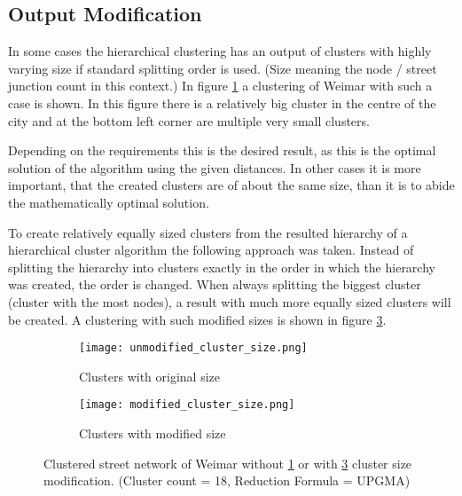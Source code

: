 \subsection{Output Modification} \label{sec:outout_modification}
In some cases the hierarchical clustering has an output of clusters with highly varying size if standard splitting order is used. (Size meaning the node / street junction count in this context.) In figure \ref{fig:unmodified_cluster_size} a clustering of Weimar with such a case is shown. In this figure there is a relatively big cluster in the centre of the city and at the bottom left corner are multiple very small clusters.

Depending on the requirements this is the desired result, as this is the optimal solution of the algorithm using the given distances. In other cases it is more important, that the created clusters are of about the same size, than it is to abide the mathematically optimal solution.

To create relatively equally sized clusters from the resulted hierarchy of a hierarchical cluster algorithm the following approach was taken. Instead of splitting the hierarchy into clusters exactly in the order in which the hierarchy was created, the order is changed. When always splitting the biggest cluster (cluster with the most nodes), a result with much more equally sized clusters will be created. A clustering with such modified sizes is shown in figure \ref{fig:modified_cluster_size}.

\begin{figure}
    \centering
    \begin{subfigure}[b]{0.49\textwidth}
        \begin{mdframed}[style=mdthight, userdefinedwidth=0.9\linewidth]
            \texttt{[image: unmodified\_cluster\_size.png]}
        \end{mdframed}
        \caption{Clusters with original size}
        \label{fig:unmodified_cluster_size}
    \end{subfigure}
    \begin{subfigure}[b]{0.49\textwidth}
        \begin{mdframed}[style=mdthight, userdefinedwidth=0.9\linewidth]
            \texttt{[image: modified\_cluster\_size.png]}
        \end{mdframed}
        \caption{Clusters with modified size}
        \label{fig:modified_cluster_size}
    \end{subfigure}
    \caption{Clustered street network of Weimar without \ref{fig:unmodified_cluster_size} or with \ref{fig:modified_cluster_size} cluster size modification. (Cluster count = 18, Reduction Formula = \acrshort{UPGMA})}
\end{figure}

